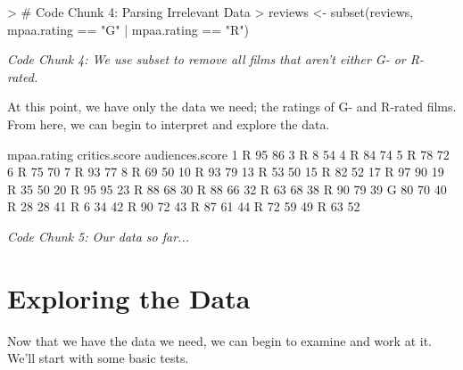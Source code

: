 \documentclass{article}
\begin{document}
\begin{Schunk}
\begin{Sinput}
> # Code Chunk 4: Parsing Irrelevant Data
> reviews <- subset(reviews, mpaa.rating == "G" | mpaa.rating == "R")
\end{Sinput}
\end{Schunk}
\emph{Code Chunk 4: We use subset to remove all films that aren't either G- or R- rated.}

At this point, we have only the data we need; the ratings of G- and R-rated films. From here, we can begin to interpret and explore the data.

\begin{Schunk}
\begin{Soutput}
   mpaa.rating critics.score audiences.score
1            R            95              86
3            R             8              54
4            R            84              74
5            R            78              72
6            R            75              70
7            R            93              77
8            R            69              50
10           R            93              79
13           R            53              50
15           R            82              52
17           R            97              90
19           R            35              50
20           R            95              95
23           R            88              68
30           R            88              66
32           R            63              68
38           R            90              79
39           G            80              70
40           R            28              28
41           R             6              34
42           R            90              72
43           R            87              61
44           R            72              59
49           R            63              52
\end{Soutput}
\end{Schunk}
\emph{Code Chunk 5: Our data so far...}

\section*{Exploring the Data}
Now that we have the data we need, we can begin to examine and work at it. We'll start with some basic tests.
\end{document}
